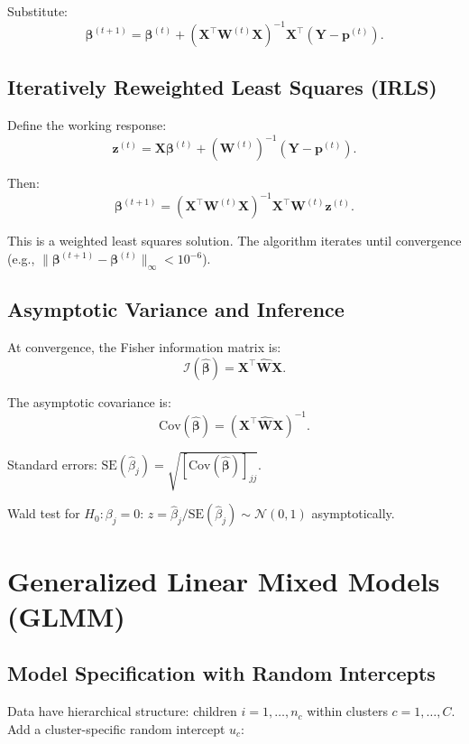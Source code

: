 \documentclass[12pt]{article}
\numberwithin{equation}{section}
\begin{document}
	Substitute:
	\[
	\boldsymbol{\beta}^{(t+1)} = \boldsymbol{\beta}^{(t)} + (\mathbf{X}^\top \mathbf{W}^{(t)} \mathbf{X})^{-1} \mathbf{X}^\top (\mathbf{Y} - \mathbf{p}^{(t)}).
	\]
	
	\subsection{Iteratively Reweighted Least Squares (IRLS)}
	
	Define the working response:
	\[
	\mathbf{z}^{(t)} = \mathbf{X} \boldsymbol{\beta}^{(t)} + (\mathbf{W}^{(t)})^{-1} (\mathbf{Y} - \mathbf{p}^{(t)}).
	\]
	
	Then:
	\[
	\boldsymbol{\beta}^{(t+1)} = (\mathbf{X}^\top \mathbf{W}^{(t)} \mathbf{X})^{-1} \mathbf{X}^\top \mathbf{W}^{(t)} \mathbf{z}^{(t)}.
	\]
	
	This is a weighted least squares solution. The algorithm iterates until convergence (e.g., $\|\boldsymbol{\beta}^{(t+1)} - \boldsymbol{\beta}^{(t)}\|_\infty < 10^{-6}$).
	
	\subsection{Asymptotic Variance and Inference}
	
	At convergence, the Fisher information matrix is:
	\[
	\mathcal{I}(\hat{\boldsymbol{\beta}}) = \mathbf{X}^\top \hat{\mathbf{W}} \mathbf{X}.
	\]
	
	The asymptotic covariance is:
	\[
	\text{Cov}(\hat{\boldsymbol{\beta}}) = (\mathbf{X}^\top \hat{\mathbf{W}} \mathbf{X})^{-1}.
	\]
	
	Standard errors: $\text{SE}(\hat{\beta}_j) = \sqrt{[\text{Cov}(\hat{\boldsymbol{\beta}})]_{jj}}$.
	
	Wald test for $H_0: \beta_j = 0$: $z = \hat{\beta}_j / \text{SE}(\hat{\beta}_j) \sim \mathcal{N}(0,1)$ asymptotically.
	
	\section{Generalized Linear Mixed Models (GLMM)}
	
	\subsection{Model Specification with Random Intercepts}
	
	Data have hierarchical structure: children $i=1,\dots,n_c$ within clusters $c=1,\dots,C$. Add a cluster-specific random intercept $u_c$:
	
\end{document}
